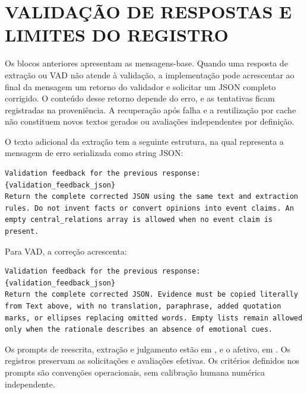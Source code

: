 \section{VALIDAÇÃO DE RESPOSTAS E LIMITES DO REGISTRO}

Os blocos anteriores apresentam as mensagens-base. Quando uma resposta de extração ou VAD não atende à validação, a implementação pode acrescentar ao final da mensagem um retorno do validador e solicitar um JSON completo corrigido. O conteúdo desse retorno depende do erro, e as tentativas ficam registradas na proveniência. A recuperação após falha e a reutilização por cache não constituem novos textos gerados ou avaliações independentes por definição.

O texto adicional da extração tem a seguinte estrutura, na qual  representa a mensagem de erro serializada como string JSON:
\begin{lstlisting}[title={Mensagem de correção da extração estrutural}]
Validation feedback for the previous response:
{validation_feedback_json}
Return the complete corrected JSON using the same text and extraction rules. Do not invent facts or convert opinions into event claims. An empty central_relations array is allowed when no event claim is present.
\end{lstlisting}

Para VAD, a correção acrescenta:
\begin{lstlisting}[title={Mensagem de correção da estimação afetiva}]
Validation feedback for the previous response:
{validation_feedback_json}
Return the complete corrected JSON. Evidence must be copied literally from Text above, with no translation, paraphrase, added quotation marks, or ellipses replacing omitted words. Empty lists remain allowed only when the rationale describes an absence of emotional cues.
\end{lstlisting}

\endgroup

Os prompts de reescrita, extração e julgamento estão em , e o afetivo, em . Os registros preservam as solicitações e avaliações efetivas. Os critérios definidos nos prompts são convenções operacionais, sem calibração humana numérica independente.
